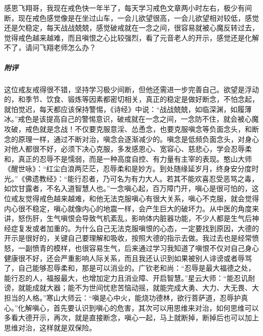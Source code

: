 \begin{case}
    感恩飞翔哥，我现在戒色快一年半了，每天学习戒色文章两小时左右，极少有间断，现在戒色感觉像是在坐过山车，一会儿欲望很高，一会儿欲望相对较低，感觉还是欠稳定，每天战战兢兢，感觉破戒就在一念之间，很容易就被心魔反转过去，觉得戒色越来越难，而且嗔恨之心比较强烈，看了元音老人的开示，感觉还是化解不了，请问飞翔老师怎么办？
    \subparagraph{附评} 这位戒友戒得很不错，坚持学习极少间断，但他还需进一步完善自己。欲望是浮动的，和季节、饮食、锻炼等因素都密切相关，真正的稳定是做好断念，不怕念起，就怕觉迟，每天都应该保持警惕，《诗经》中说：“战战兢兢，如临深渊，如履薄冰。”戒色是该提高自己的警惕意识，破戒就在一念之间，一念防不住，就会被心魔攻破，戒色就是念战！不仅要克服意淫、怂恿念，也要克服嗔念等负面念头，和断念的原理一样，通过不断对治，嗔念会逐渐减少的。嗔念是低频负面念头，对身心对他人都很不好，必须下决心克服，多发感恩心、宽容心、慈悲心，学会忍辱柔和，真正的忍辱不是懦弱，而是一种高度自控、有力量有主宰的表现。憨山大师《醒世咏》：“红尘白浪两茫茫，忍辱柔和是妙方。到处随缘延岁月，终身安分度时光。”《佛遗教经》：“能行忍者，乃可名为有力大人。若其不能欢喜忍受恶骂之毒，如饮甘露者，不名入道智慧人也。”一念嗔心起，百万障门开，嗔心是很可怕的，这位戒友觉得戒色越来越难，和他无法克服嗔心有很大关系，嗔心不克服，就会觉得内心很不稳定，嗔心就像内心的地震一样，会产生巨大的破坏力。从中医的角度来讲，怒伤肝，生气嗔恨会导致气机紊乱，影响体内脏器功能，不少人都是生气后神经症复发或者加重的。为什么自己无法克服嗔恨的心态，一定要找到原因，大德的开示是很好的，关键自己要理解和吸收，按照大德的指示去做。我过去也是经常愤怒，一副愤青的模样，也很容易生气，后来通过学习我知道了嗔恨不仅对自己身心健康很不好，还会严重影响人际关系，而且我还认识到如果被别人诽谤或者辱骂了，自己能够忍辱柔和，那是可以消业的。广钦老和尚：“忍辱是最大福德之处，能行忍的人，福报最大，也增加定力且消业障、开启智慧。”星云大师：“能忍讥耐谤，就能成就大器；能不为世间忧悲苦恼动摇，就能完成大勇、大力、大无畏、大担当的人格。”寒山大师云：“嗔是心中火，能烧功德林，欲行菩萨道，忍辱护真心。”化解嗔心，首先要认识到嗔心的危害，其次可以用思维来对治，如何思维可以多看大德开示，再次，就是直接断念，嗔心一起，马上就断掉，断掉后也可以加上思维对治，这样就是双保险。
\end{case}

